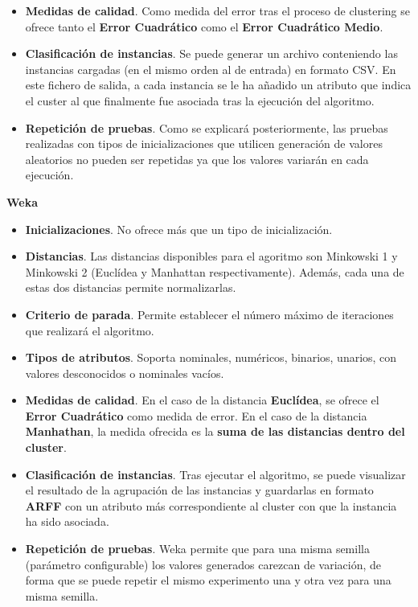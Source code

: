 \documentclass[a4paper]{report}
\begin{document}
\begin{itemize}
		\item	\textbf{Medidas de calidad}. Como medida del error tras el proceso de clustering se ofrece tanto el \textbf{Error Cuadrático} como el \textbf{Error Cuadrático Medio}.
		
		\item	\textbf{Clasificación de instancias}. Se puede generar un archivo conteniendo las instancias cargadas (en el mismo orden al de entrada) en formato CSV. En este fichero de salida, a cada instancia se le ha añadido un atributo que indica el custer al que finalmente fue asociada tras la ejecución del algoritmo.
		
		\item	\textbf{Repetición de pruebas}. Como se explicará posteriormente, las pruebas realizadas con tipos de inicializaciones que utilicen generación de valores aleatorios no pueden ser repetidas ya que los valores variarán en cada ejecución.
	\end{itemize}
	
	\begin{center}
		\textbf{Weka}
	\end{center}
	
	\begin{itemize}
		\item	\textbf{Inicializaciones}. No ofrece más que un tipo de inicialización.
		
		\item	\textbf{Distancias}. Las distancias disponibles para el agoritmo son Minkowski 1 y Minkowski 2 (Euclídea y Manhattan respectivamente). Además, cada una de estas dos distancias permite normalizarlas.
		
		\item	\textbf{Criterio de parada}. Permite establecer el número máximo de iteraciones que realizará el algoritmo.
		\item	\textbf{Tipos de atributos}. Soporta nominales, numéricos, binarios, unarios, con valores desconocidos o nominales vacíos.
		\item	\textbf{Medidas de calidad}. En el caso de la distancia \textbf{Euclídea}, se ofrece el \textbf{Error Cuadrático} como medida de error. En el caso de la distancia \textbf{Manhathan}, la medida ofrecida es la \textbf{suma de las distancias dentro del cluster}.
		\item	\textbf{Clasificación de instancias}. Tras ejecutar el algoritmo, se puede visualizar el resultado de la agrupación de las instancias y guardarlas en formato \textbf{ARFF} con un atributo más correspondiente al cluster con que la instancia ha sido asociada.
		
		\item	\textbf{Repetición de pruebas}. Weka permite que para una misma semilla (parámetro configurable) los valores generados carezcan de variación, de forma que se puede repetir el mismo experimento una y otra vez para una misma semilla.
	\end{itemize}
	
\end{document}
